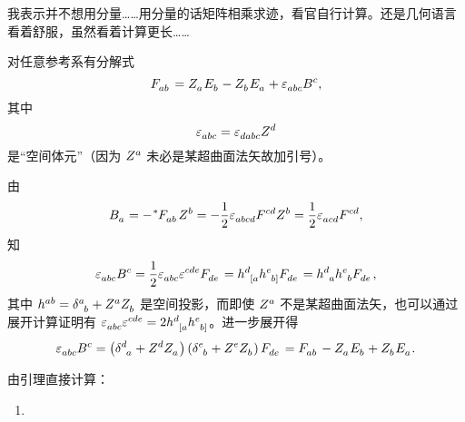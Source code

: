 \begin{xiti}
		\begin{zm}
			我表示并不想用分量……用分量的话矩阵相乘求迹，看官自行计算。还是几何语言看着舒服，虽然看着计算更长……
			\begin{Lemma}
				\label{lemma-6.15}
				对任意参考系有分解式
				\begin{equation*}
					\tensor{F}{_a_b} = \tensor{Z}{_a} \tensor{E}{_b} - \tensor{Z}{_b} \tensor{E}{_a} + \tensor{\varepsilon}{_a_b_c} \tensor{B}{^c},
				\end{equation*}
				其中
				\begin{equation*}
					\tensor{\varepsilon}{_a_b_c} = \tensor{\varepsilon}{_d_a_b_c} \tensor{Z}{^d}
				\end{equation*}
				是“空间体元”（因为 $\tensor{Z}{^a}$ 未必是某超曲面法矢故加引号）。
			\end{Lemma}
			\begin{Proof}
				由
				\begin{equation*}
					\tensor{B}{_a} = - \tensor[^*]{F}{_a_b} \tensor{Z}{^b} = - \frac{1}{2} \tensor{\varepsilon}{_a_b_c_d} \tensor{F}{^c^d} \tensor{Z}{^b} = \frac{1}{2} \tensor{\varepsilon}{_a_c_d} \tensor{F}{^c^d},
				\end{equation*}
				知
				\begin{equation*}
					\tensor{\varepsilon}{_a_b_c} \tensor{B}{^c} = \frac{1}{2} \tensor{\varepsilon}{_a_b_c} \tensor{\varepsilon}{^c^d^e} \tensor{F}{_d_e} = \tensor{h}{^{d}_{[a}} \tensor{h}{^{e}_{b]}} \tensor{F}{_d_e} = \tensor{h}{^{d}_a} \tensor{h}{^{e}_b} \tensor{F}{_d_e},
				\end{equation*}
				其中 $\tensor{h}{^a^b} = \tensor{\delta}{^a_b} + \tensor{Z}{^a} \tensor{Z}{_b}$ 是空间投影，而即使 $\tensor{Z}{^a}$ 不是某超曲面法矢，也可以通过展开计算证明有 $\tensor{\varepsilon}{_a_b_c} \tensor{\varepsilon}{^c^d^e} = 2\tensor{h}{^{d}_{[a}} \tensor{h}{^{e}_{b]}}$。进一步展开得
				\begin{equation*}
					\tensor{\varepsilon}{_a_b_c} \tensor{B}{^c} = \left( \tensor{\delta}{^d_a} + \tensor{Z}{^d} \tensor{Z}{_a} \right) \left( \tensor{\delta}{^e_b} + \tensor{Z}{^e} \tensor{Z}{_b} \right) \tensor{F}{_d_e} = \tensor{F}{_a_b} - \tensor{Z}{_a} \tensor{E}{_b} + \tensor{Z}{_b} \tensor{E}{_a}.
				\end{equation*}
			\end{Proof}
			由引理直接计算：
			\begin{enumerate}[label=(\alph*)]
				\item
				\begin{equation*}
					\begin{split}

\end{split}
\end{equation*}
\end{enumerate}
\end{zm}
\end{xiti}
